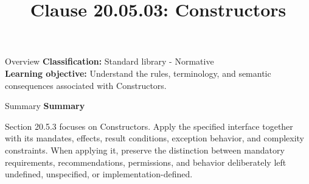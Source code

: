 \documentclass[10pt,letterpaper]{article}
\title{Clause 20.05.03: Constructors}
\author{}
\date{}
\begin{document}
\maketitle
\begin{CornellOverviewBox}{Overview}
\textbf{Classification:} Standard library - Normative\\[2pt]
\textbf{Learning objective:} Understand the rules, terminology, and semantic consequences associated with Constructors.
\end{CornellOverviewBox}\begin{CornellSummaryBox}{Summary}
{\sffamily\bfseries\color{Accent} Summary}\par\vspace{3pt}Section 20.5.3 focuses on Constructors. Apply the specified interface together with its mandates, effects, result conditions, exception behavior, and complexity constraints. When applying it, preserve the distinction between mandatory requirements, recommendations, permissions, and behavior deliberately left undefined, unspecified, or implementation-defined.
\end{CornellSummaryBox}
\end{document}
